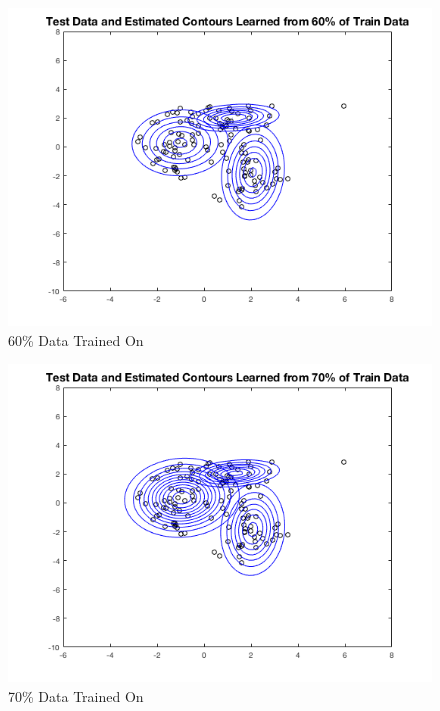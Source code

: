 \documentclass[english]{article}
\begin{document}
\begin{enumerate}
\begin{enumerate}
	\begin{figure}[H]
        \centering
    	\includegraphics[scale = 0.5]{3_1_b_60}
    	\caption{60\% Data Trained On}
    	\label{fig:3_1_b_60}
    	\end{figure}
	
	\begin{figure}[H]
        \centering
    	\includegraphics[scale = 0.5]{3_1_b_70}
    	\caption{70\% Data Trained On}
    	\label{fig:3_1_b_70}
    	\end{figure}
	

\end{enumerate}
\end{enumerate}
\end{document}
